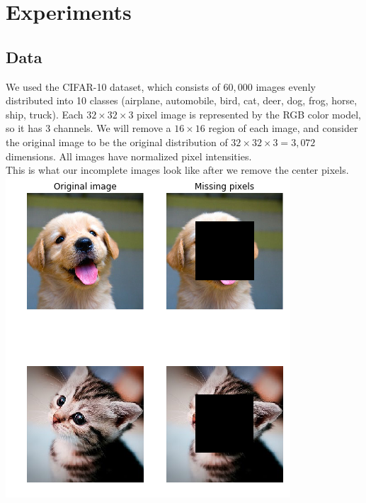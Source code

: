 \documentclass[10pt,twocolumn,letterpaper]{article}
\begin{document}
\section{Experiments} 
\subsection{Data}
We used the CIFAR-10 dataset, which consists of $60,000$ images evenly distributed into 10 classes (airplane, automobile, bird, cat, deer, dog, frog, horse, ship, truck). Each $32 \times 32 \times 3$ pixel image is represented by the RGB color model, so it has 3 channels. We will remove a $16 \times 16$ region of each image, and consider the original image to be the original distribution of $32 \times 32 \times 3 = 3,072$ dimensions. All images have normalized pixel intensities. \\

This is what our incomplete images look like after we remove the center pixels.\\
\includegraphics[width=1.0\linewidth]{img_sample.png}
\end{document}
